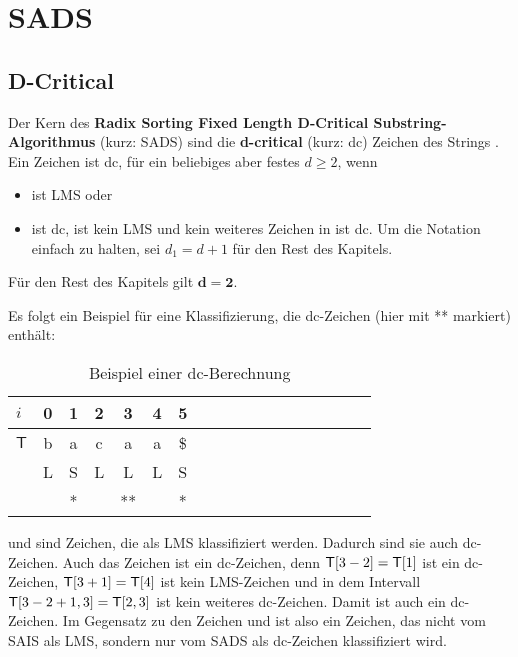 \section{SADS}
\subsection{D-Critical}
\label{dc}


Der  Kern des \textbf{Radix Sorting Fixed Length D-Critical Substring-Algo\-rithmus}\cite[Kap.~4]{saca:6} (kurz: SADS) sind die \textbf{d-critical} (kurz: dc) Zeichen des Strings . Ein Zeichen ist dc, für ein beliebiges aber festes $d \geq 2$, wenn
\begin{itemize}
    \item {} ist LMS oder
    \item {} ist dc,  ist kein LMS und kein weiteres Zeichen in  ist dc. Um die Notation einfach zu halten, sei $d_1=d+1$ für den Rest des Kapitels.
\end{itemize}

\noindent Für den Rest des Kapitels gilt $\mathbf{d=2}$.

Es folgt ein Beispiel für eine Klassifizierung, die dc-Zeichen (hier mit ** markiert) enthält:

\begin{table}[H]
\centering
  \begin{tabular}{ | l | c | c| c| c| c| c| c| c| c| c| c| c| c| c| c| c| c | }
    \hline
        $i$ & 0 & 1 & 2 & 3 & 4 & 5 \\ \hline
        $\mathsf{T}$ & b & a & c & a & a & \$ \\ \hline
        $ $ & L & S & L & L & L & S \\ \hline
      	$ $ & & * & & ** & & * \\
    \hline
  \end{tabular}
  \caption{Beispiel einer dc-Berechnung}
\end{table}
\bigskip

\noindent {} und  sind Zeichen, die als LMS klassifiziert werden. Dadurch sind sie auch dc-Zeichen. Auch das Zeichen  ist ein dc-Zeichen, denn $\inputtext[3 - 2] = \inputtext[1]$ ist ein dc-Zeichen, $\inputtext[3 + 1] = \inputtext[4]$ ist kein LMS-Zeichen und in dem Intervall $\inputtext[3-2+1,3] = \inputtext[2,3]$ ist kein weiteres dc-Zeichen. Damit ist  auch ein dc-Zeichen. Im Gegensatz zu den Zeichen  und  ist  also ein Zeichen, das nicht vom SAIS als LMS, sondern nur vom SADS als dc-Zeichen klassifiziert wird.

